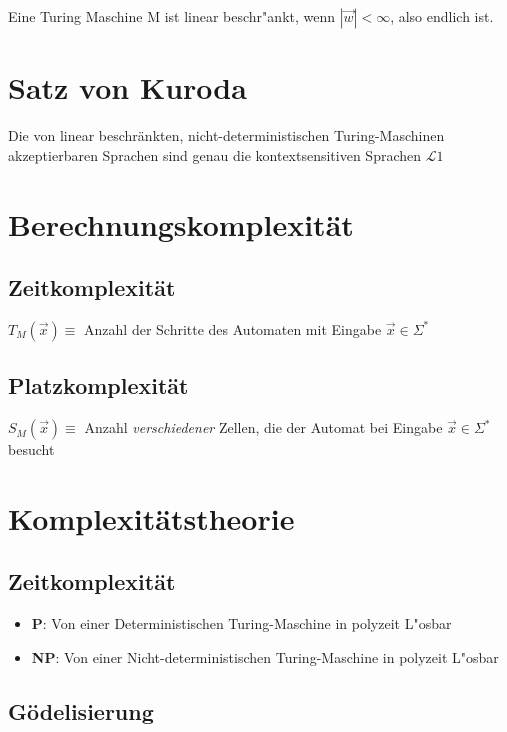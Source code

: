 \documentclass[11pt, a4paper]{scrartcl}
\begin{document}
Eine Turing Maschine M ist linear beschr"ankt, wenn $|\vec{w}| < \infty$, also endlich ist.

\section{Satz von Kuroda}

Die von linear beschränkten, nicht-deterministischen Turing-Maschinen akzeptierbaren Sprachen sind genau die kontextsensitiven Sprachen $\mathcal{L}1$

\newpage



\section{Berechnungskomplexität}

\subsection{Zeitkomplexität}

$T_M(\vec{x}) \equiv$ Anzahl der Schritte des Automaten mit Eingabe $\vec{x} \in \Sigma^*$

\subsection{Platzkomplexität}

$S_M(\vec{x}) \equiv$ Anzahl \textit{verschiedener} Zellen, die der Automat bei Eingabe $\vec{x} \in \Sigma^*$ besucht


\section{Komplexitätstheorie}

\subsection{Zeitkomplexität}

\begin{itemize}
    \item \textbf{P}: Von einer Deterministischen Turing-Maschine in polyzeit L"osbar
    \item \textbf{NP}: Von einer Nicht-deterministischen Turing-Maschine in polyzeit L"osbar
\end{itemize}


\subsection{Gödelisierung}
\end{document}
